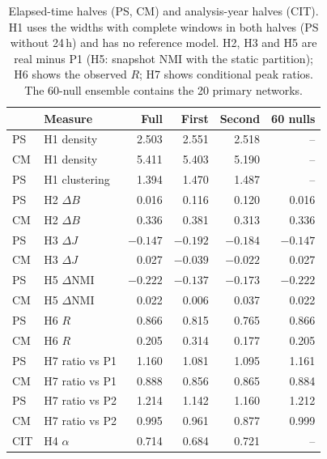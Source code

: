 \begin{table}[t]
\centering\small
\setlength{\tabcolsep}{4pt}
\begin{tabular*}{\columnwidth}{@{\extracolsep{\fill}}llrrrr@{}}
\toprule & Measure & Full & First & Second & 60 nulls \\
\midrule
PS & H1 density & 2.503 & 2.551 & 2.518 & -- \\
CM & H1 density & 5.411 & 5.403 & 5.190 & -- \\
PS & H1 clustering & 1.394 & 1.470 & 1.487 & -- \\
PS & H2 $\Delta B$ & 0.016 & 0.116 & 0.120 & 0.016 \\
CM & H2 $\Delta B$ & 0.336 & 0.381 & 0.313 & 0.336 \\
PS & H3 $\Delta J$ & $-0.147$ & $-0.192$ & $-0.184$ & $-0.147$ \\
CM & H3 $\Delta J$ & 0.027 & $-0.039$ & $-0.022$ & 0.027 \\
PS & H5 $\Delta$NMI & $-0.222$ & $-0.137$ & $-0.173$ & $-0.222$ \\
CM & H5 $\Delta$NMI & 0.022 & 0.006 & 0.037 & 0.022 \\
PS & H6 $R$ & 0.866 & 0.815 & 0.765 & 0.866 \\
CM & H6 $R$ & 0.205 & 0.314 & 0.177 & 0.205 \\
PS & H7 ratio vs P1 & 1.160 & 1.081 & 1.095 & 1.161 \\
CM & H7 ratio vs P1 & 0.888 & 0.856 & 0.865 & 0.884 \\
PS & H7 ratio vs P2 & 1.214 & 1.142 & 1.160 & 1.212 \\
CM & H7 ratio vs P2 & 0.995 & 0.961 & 0.877 & 0.999 \\
CIT & H4 $\alpha$ & 0.714 & 0.684 & 0.721 & -- \\
\bottomrule\end{tabular*}
\caption{Elapsed-time halves (PS, CM) and analysis-year halves (CIT). H1 uses the widths
with complete windows in both halves (PS without 24\,h) and has no reference model. H2, H3 and H5 are real minus P1 (H5: snapshot NMI with the static partition); H6 shows the observed $R$;
H7 shows conditional peak ratios. The 60-null ensemble contains the 20 primary networks.}
\label{tab:robust-halves}
\end{table}
